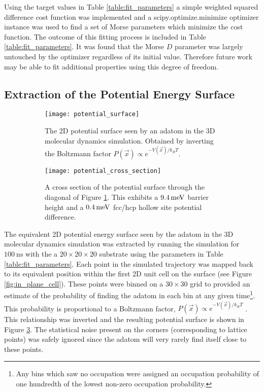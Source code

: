 Using the target values in Table \ref{table:fit_parameters} a simple weighted squared difference cost function was implemented and a scipy.optimize.minimize \cite{2020SciPy-NMeth} optimizer instance was used to find a set of Morse parameters which minimize the cost function. The outcome of this fitting process is included in Table \ref{table:fit_parameters}. It was found that the Morse $D$ parameter was largely untouched by the optimizer regardless of its initial value. Therefore future work may be able to fit additional properties using this degree of freedom.

\subsection{Extraction of the Potential Energy Surface} \label{sec:extract_potential}


\begin{figure}
	\centering
	\begin{subfigure}[t]{0.48\textwidth}
		\texttt{[image: potential\_surface]}
		\caption{The 2D potential surface seen by an adatom in the 3D molecular dynamics simulation. Obtained by inverting the Boltzmann factor $P(\vec{x}) \propto e^{-V(\vec{x})/k_BT}$.}
		\label{fig:potential_surface_plot}
	\end{subfigure}
	\hfill
	\begin{subfigure}[t]{0.48\textwidth}
		\texttt{[image: potential\_cross\_section]}
		\caption{A cross section of the potential surface through the diagonal of Figure \ref{fig:potential_surface_plot}. This exhibits a $\SI{9.4}{\mev}$ barrier height and a $\SI{0.4}{\mev}$ fcc/hcp hollow site potential difference.}
		\label{fig:potential_cross_section}
	\end{subfigure}
	\caption{}
	\label{fig:potential_surface}
\end{figure}

The equivalent 2D potential energy surface seen by the adatom in the 3D molecular dynamics simulation was extracted by running the simulation for $\SI{100}{\nano\second}$ with the a $20\times20\times20$ substrate using the parameters in Table \ref{table:fit_parameters}. Each point in the simulated trajectory was mapped back to its equivalent position within the first 2D unit cell on the surface (see Figure \ref{fig:in_plane_cell}). These points were binned on a $30\times30$ grid to provided an estimate of the probability of finding the adatom in each bin at any given time\footnote{Any bins which saw no occupation were assigned an occupation probability of one hundredth of the lowest non-zero occupation probability.}. This probability is proportional to a Boltzmann factor, $P\left(\vec{x}\right) \propto e^{-V\left(\vec{x}\right)/k_BT}$ \cite{Pathria}. This relationship was inverted and the resulting potential surface is shown in Figure \ref{fig:potential_surface}. The statistical noise present on the corners (corresponding to lattice points) was safely ignored since the adatom will very rarely find itself close to these points.

